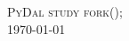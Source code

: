 \documentclass[twoside]{article}
\begin{document}
\begin{titlepage}

\textsc{ PyDal study fork(); }\\[1.5cm] %


{\large \today}\\[3cm] %


 


\end{titlepage}


\tableofcontents
\newpage






\end{document}

